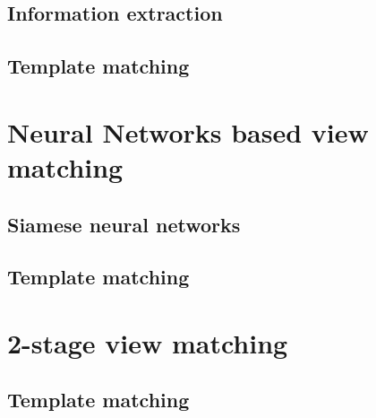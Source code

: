 \subsection{Information extraction}

\subsection{Template matching}

\section{Neural Networks based view matching}

\subsection{Siamese neural networks}

\subsection{Template matching}

\section{2-stage view matching}

\subsection{Template matching}


